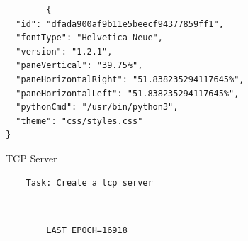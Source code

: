 \documentclass{article}
\begin{document}
\begin{lstlisting}
        {
  "id": "dfada900af9b11e5beecf94377859ff1",
  "fontType": "Helvetica Neue",
  "version": "1.2.1",
  "paneVertical": "39.75%",
  "paneHorizontalRight": "51.838235294117645%",
  "paneHorizontalLeft": "51.838235294117645%",
  "pythonCmd": "/usr/bin/python3",
  "theme": "css/styles.css"
}
    \end{lstlisting}
\pagebreak


{\large TCP Server  } \\[0.5in]
\begin{flushleft}
\begin{lstlisting}
    Task: Create a tcp server
\end{lstlisting}\\[1in]
\end{flushleft}


\begin{lstlisting}
        LAST_EPOCH=16918

    \end{lstlisting}
\pagebreak
\end{document}
